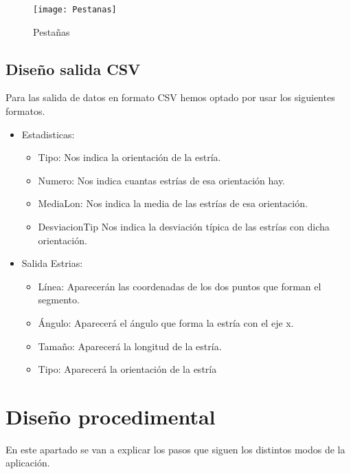 \begin{figure}[h]
\centering
\texttt{[image: Pestanas]}
\caption{Pestañas}
\label{fig:5.13}
\end{figure}
\subsection{Diseño salida CSV}
Para las salida de datos en formato CSV hemos optado por usar los siguientes formatos.
\begin{itemize}
	\item Estadisticas: 
		\begin{itemize}
			\item Tipo: Nos indica la orientación de la estría.	
			\item Numero: Nos indica cuantas estrías de esa orientación hay.
			\item MediaLon: Nos indica la media de las estrías de esa orientación.
			\item DesviacionTip Nos indica la desviación típica de las estrías con dicha orientación.
		\end{itemize}
	\item Salida Estrias:
		\begin{itemize}
			\item Línea: Aparecerán las coordenadas de los dos puntos que forman el segmento.
			\item Ángulo: Aparecerá el ángulo que forma la estría con el eje x.
			\item Tamaño: Aparecerá	la longitud de la estría.
			\item Tipo: Aparecerá la orientación de la estría
		\end{itemize}			

\end{itemize}
\section{Diseño procedimental}
En este apartado se van a explicar los pasos que siguen los distintos modos de la aplicación.


